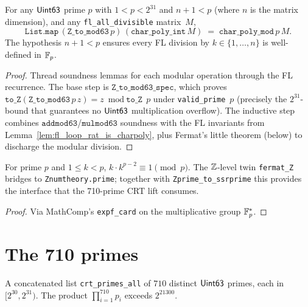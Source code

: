 \begin{theorem}\label{thm:char_poly_mod_sound}
\rocqok
{}
For any $\mathsf{Uint63}$ prime $p$ with $1 < p < 2^{31}$ and $n + 1 < p$
(where $n$ is the matrix dimension), and any \texttt{fl\_all\_divisible}
matrix~$M$,
\[
\texttt{List.map}\,(\texttt{Z\_to\_mod63}\,p)\,(\texttt{char\_poly\_int}\,M)
   \;=\; \texttt{char\_poly\_mod}\,p\,M.
\]
The hypothesis $n + 1 < p$ ensures every FL division by $k \in \{1, \ldots, n\}$
is well-defined in $\mathbb{F}_p$.
\end{theorem}
\begin{proof}\rocqok
Thread soundness lemmas for each modular operation through the FL
recurrence. The base step is $\texttt{Z\_to\_mod63\_spec}$, which
proves
$\texttt{to\_Z}(\texttt{Z\_to\_mod63}\,p\,z) = z \bmod \texttt{to\_Z}\,p$
under \texttt{valid\_prime}~$p$ (precisely the
$2^{31}$-bound that guarantees no $\mathsf{Uint63}$ multiplication overflow).
The inductive step combines $\texttt{addmod63}$/$\texttt{mulmod63}$
soundness with the FL invariants from
Lemma~\ref{lem:fl_loop_rat_is_charpoly}, plus Fermat's little theorem
(below) to discharge the modular division.
\end{proof}

\begin{lemma}
\label{lem:fermat_mod}
\rocqok
For prime $p$ and $1 \le k < p$,
$k \cdot k^{p - 2} \equiv 1 \pmod{p}$.
The $\mathbb{Z}$-level twin \texttt{fermat\_Z} bridges to
\texttt{Znumtheory.prime}; together with
\texttt{Zprime\_to\_ssrprime} this provides the interface that the
710-prime CRT lift consumes.
\end{lemma}
\begin{proof}\rocqok
Via MathComp's \texttt{expf\_card} on the multiplicative group $\mathbb{F}_p^\ast$.
\end{proof}

\section{The 710 primes}

\begin{definition}\label{def:crt_primes}
\rocqok
A concatenated list \texttt{crt\_primes\_all} of $710$ distinct
$\mathsf{Uint63}$ primes, each in $[2^{30}, 2^{31})$. The product
$\prod_{i=1}^{710} p_i$ exceeds $2^{21300}$.
\end{definition}

